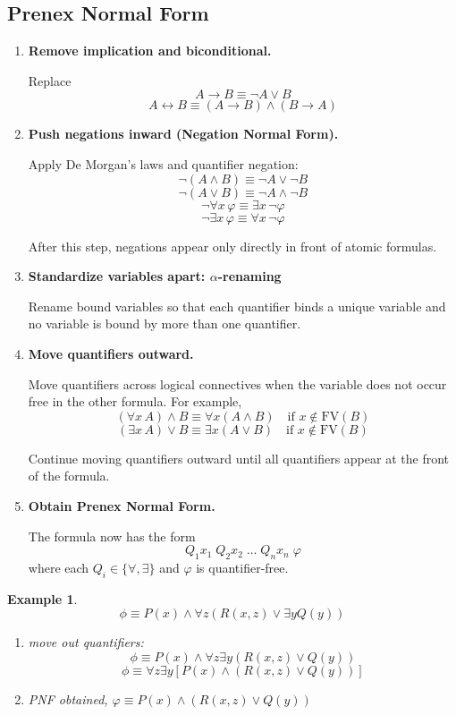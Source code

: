 \documentclass{article}
\newtheorem{example}[theorem]{Example}
\begin{document}
\subsection{Prenex Normal Form}
\begin{enumerate}
    \item \textbf{Remove implication and biconditional.}

    Replace
    \[
    A \rightarrow B \equiv \neg A \lor B
    \]
    \[
    A \leftrightarrow B \equiv (A \rightarrow B) \land (B \rightarrow A)
    \]

    \item \textbf{Push negations inward (Negation Normal Form).}

    Apply De Morgan's laws and quantifier negation:
    \[
    \neg(A \land B) \equiv \neg A \lor \neg B
    \]
    \[
    \neg(A \lor B) \equiv \neg A \land \neg B
    \]
    \[
    \neg \forall x \, \varphi \equiv \exists x \, \neg \varphi
    \]
    \[
    \neg \exists x \, \varphi \equiv \forall x \, \neg \varphi
    \]

    After this step, negations appear only directly in front of atomic formulas.

    \item \textbf{Standardize variables apart: $\alpha$-renaming}

    Rename bound variables so that each quantifier binds a unique variable and no variable is bound by more than one quantifier.

    \item \textbf{Move quantifiers outward.}

    Move quantifiers across logical connectives when the variable does not occur free in the other formula. For example,
    \[
    (\forall x \, A) \land B \equiv \forall x (A \land B)
    \quad \text{if } x \notin \mathrm{FV}(B)
    \]
    \[
    (\exists x \, A) \lor B \equiv \exists x (A \lor B)
    \quad \text{if } x \notin \mathrm{FV}(B)
    \]

    Continue moving quantifiers outward until all quantifiers appear at the front of the formula.

    \item \textbf{Obtain Prenex Normal Form.}

    The formula now has the form
    \[
    Q_1 x_1 \; Q_2 x_2 \; \dots \; Q_n x_n \; \varphi
    \]
    where each \(Q_i \in \{\forall,\exists\}\) and \(\varphi\) is quantifier-free.
\end{enumerate}
\begin{example}
    \[\phi \equiv P(x) \land \forall z (R(x, z)\lor \exists y Q(y))\]
    \begin{enumerate}
        \item move out quantifiers: 
        \[\phi \equiv P(x) \land \forall z\exists y (R(x, z) \lor Q(y))\]
        \[\phi \equiv \forall z\exists y [P(x) \land (R(x, z) \lor Q(y))]\]
        \item PNF obtained, $\varphi \equiv P(x) \land (R(x, z) \lor Q(y))$
    \end{enumerate}
\end{example}
\end{document}
